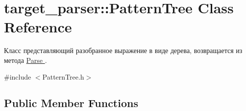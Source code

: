 \hypertarget{classtarget__parser_1_1PatternTree}{}\section{target\+\_\+parser\+:\+:Pattern\+Tree Class Reference}
\label{classtarget__parser_1_1PatternTree}


Класс представляющий разобранное выражение в виде дерева, возвращается из метода \hyperlink{namespacetarget__parser_a3e0ffa10d4fd38f05986d81c0529fdc1}{Parse }.  




{\ttfamily \#include $<$Pattern\+Tree.\+h$>$}

\subsection*{Public Member Functions}
